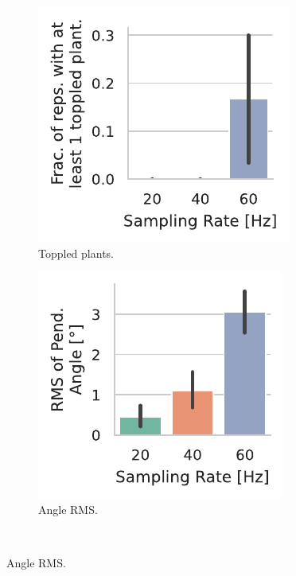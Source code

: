 \begin{figure}[t]
    \centering
    \begin{subfigure}[h]{.5\textwidth}
        \centering
        \includegraphics[width=.8\textwidth]{publications/2022CLEAVE/plots/fixed_video_topple_frac}
        \caption{Toppled plants.}\label{paper:olguinmunoz2022cleave:fig:video:toppled}
    \end{subfigure}%
    \begin{subfigure}[h]{.5\textwidth}
        \centering
        \includegraphics[width=.8\textwidth]{publications/2022CLEAVE/plots/fixed_video_angle_rms}
        \caption{Angle \gls{RMS}.}\label{paper:olguinmunoz2022cleave:fig:video:rms}
    \end{subfigure}\\

\end{figure}
